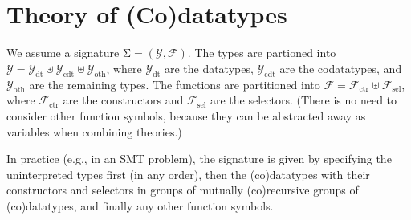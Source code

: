 \documentclass[a4paper,oribibl,envcountsame,draft]{llncs}
\newcommand\Sig{\mathrm{\Sigma}}
\newcommand\ty[1]{\textit{#1}}
\newcommand\Types{\mathcal{Y}}
\newcommand\Funcs{\mathcal{F}}
\newcommand\Data{\Types_{\mathrm{dt}}}
\newcommand\Codata{\Types_{\mathrm{cdt}}}
\newcommand\Nondata{\Types_{\mathrm{oth}}}
\newcommand\Ctr{\Funcs_{\mathrm{ctr}}}
\newcommand\Sel{\Funcs_{\mathrm{sel}}}
\begin{document}

\section{Theory of (Co)datatypes}
\label{sec:theory-of-co-datatypes}

We assume a signature $\Sig = (\Types, \Funcs)$. The types are partioned into
$\Types = \Data \mathrel{\uplus} \Codata \mathrel{\uplus} \Nondata$, where $\Data$ are the
datatypes, $\Codata$ are the codatatypes, and $\Nondata$ are the remaining
types. The functions are partitioned into $\Funcs = \Ctr \mathrel{\uplus} \Sel$, where
$\Ctr$ are the constructors and $\Sel$ are the selectors. (There is no need to
consider other function symbols, because they can be abstracted away as
variables when combining theories.)

In practice (e.g., in an SMT problem), the signature is given by specifying the
uninterpreted types first (in any order), then the (co)datatypes with their
constructors and selectors in groups of mutually (co)recursive groups of
(co)datatypes, and finally any other function symbols.
\end{document}
